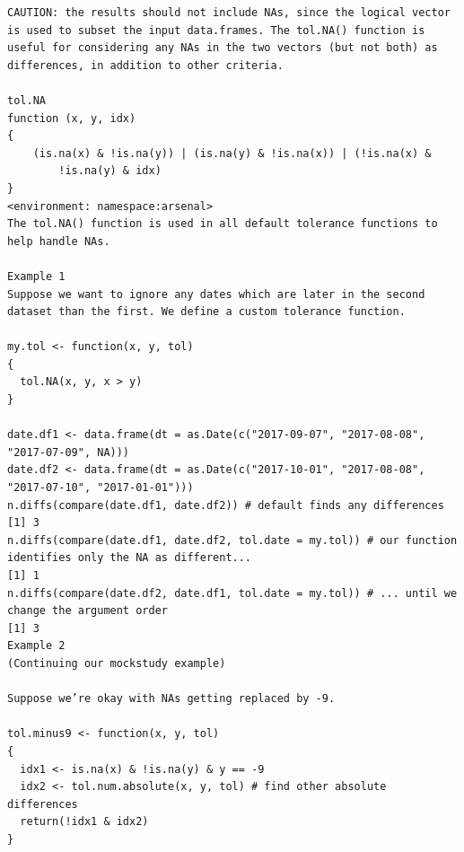 \documentclass[
]{book}
\begin{document}
\begin{verbatim}
CAUTION: the results should not include NAs, since the logical vector is used to subset the input data.frames. The tol.NA() function is useful for considering any NAs in the two vectors (but not both) as differences, in addition to other criteria.

tol.NA
function (x, y, idx) 
{
    (is.na(x) & !is.na(y)) | (is.na(y) & !is.na(x)) | (!is.na(x) & 
        !is.na(y) & idx)
}
<environment: namespace:arsenal>
The tol.NA() function is used in all default tolerance functions to help handle NAs.

Example 1
Suppose we want to ignore any dates which are later in the second dataset than the first. We define a custom tolerance function.

my.tol <- function(x, y, tol)
{
  tol.NA(x, y, x > y)
}

date.df1 <- data.frame(dt = as.Date(c("2017-09-07", "2017-08-08", "2017-07-09", NA)))
date.df2 <- data.frame(dt = as.Date(c("2017-10-01", "2017-08-08", "2017-07-10", "2017-01-01")))
n.diffs(compare(date.df1, date.df2)) # default finds any differences
[1] 3
n.diffs(compare(date.df1, date.df2, tol.date = my.tol)) # our function identifies only the NA as different...
[1] 1
n.diffs(compare(date.df2, date.df1, tol.date = my.tol)) # ... until we change the argument order
[1] 3
Example 2
(Continuing our mockstudy example)

Suppose we’re okay with NAs getting replaced by -9.

tol.minus9 <- function(x, y, tol)
{
  idx1 <- is.na(x) & !is.na(y) & y == -9
  idx2 <- tol.num.absolute(x, y, tol) # find other absolute differences
  return(!idx1 & idx2)
}


\end{verbatim}
\end{document}

